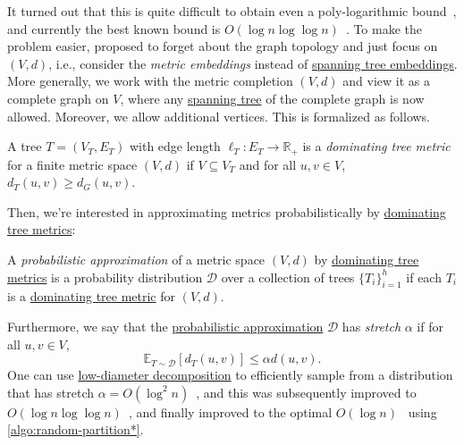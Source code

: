 It turned out that this is quite difficult to obtain even a poly-logarithmic bound~\cite{elkin2005lower}, and currently the best known bound is \(O(\log n \log \log n)\)~\cite{abraham2008nearly}. To make the problem easier, \cite{bartal1996probabilistic} proposed to forget about the graph topology and just focus on \((V, d)\), i.e., consider the \emph{metric embeddings} instead of \hyperref[prb:tree-embedding]{spanning tree embeddings}. More generally, we work with the metric completion \((V, d)\) and view it as a complete graph on \(V\), where any \hyperref[def:spanning-tree]{spanning tree} of the complete graph is now allowed. Moreover, we allow additional vertices. This is formalized as follows.

\begin{definition}\label{def:dominating-tree-metric}
  A tree \(T = (V_T, E_T)\) with edge length \(\ell _T \colon E_T \to \mathbb{R} _+\) is a \emph{dominating tree metric} for a finite metric space \((V, d)\) if \(V \subseteq V_T\) and for all \(u, v \in V\), \(d_T(u, v) \geq d_G(u, v)\).
\end{definition}

Then, we're interested in approximating metrics probabilistically by \hyperref[def:dominating-tree-metric]{dominating tree metrics}:

\begin{definition}\label{def:probabilistic-approximation}
  A \emph{probabilistic approximation} of a metric space \((V, d)\) by \hyperref[def:dominating-tree-metric]{dominating tree metrics} is a probability distribution \(\mathcal{D} \) over a collection of trees \(\{ T_i \} _{i = 1}^{h}\) if each \(T_i\) is a \hyperref[def:dominating-tree-metric]{dominating tree metric} for \((V, d)\).
\end{definition}

Furthermore, we say that the \hyperref[def:probabilistic-approximation]{probabilistic approximation} \(\mathcal{D} \) has \emph{stretch} \(\alpha \) if for all \(u, v \in V\),
\[
  \mathbb{E}_{T \sim \mathcal{D} }[d_T(u, v)]
  \leq \alpha d(u, v).
\]
One can use \hyperref[def:low-diameter-decomposition]{low-diameter decomposition} to efficiently sample from a distribution that has stretch \(\alpha = O(\log ^2 n)\)~\cite{bartal1996probabilistic}, and this was subsequently improved to \(O(\log n \log \log n)\)~\cite{bartal1998approximating}, and finally improved to the optimal \(O(\log n)\)~\cite{fakcharoenphol2003tight} using \autoref{algo:random-partition*}.

